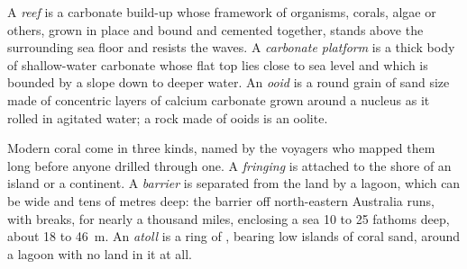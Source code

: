 \begin{definition}\label{def:b1:chemical-biogenic-sediments:reef}
A \emph{reef} is a carbonate build-up whose framework of organisms,
corals, algae or others, grown in place and bound and cemented together, stands
above the surrounding sea floor and resists the waves. A \emph{carbonate
platform} is a thick body of shallow-water carbonate
whose flat top lies close to sea level and which is bounded by a slope down to
deeper water. An \emph{ooid} is a round grain of sand size made of
concentric layers of calcium carbonate grown around a nucleus as it rolled in
agitated water; a rock made of ooids is an oolite.
\end{definition}

Modern coral  come in three kinds, named by the voyagers who mapped them
long before anyone drilled through one. A \emph{fringing}  is attached to
the shore of an island or a continent. A \emph{barrier}  is separated from
the land by a lagoon, which can be wide and tens of metres deep: the barrier
off north-eastern Australia runs, with breaks, for nearly a thousand miles,
enclosing a sea 10 to 25 fathoms deep, about 18 to \qty{46}{m}. An
\emph{atoll} is a ring of , bearing low islands of coral sand, around a
lagoon with no land in it at all.

